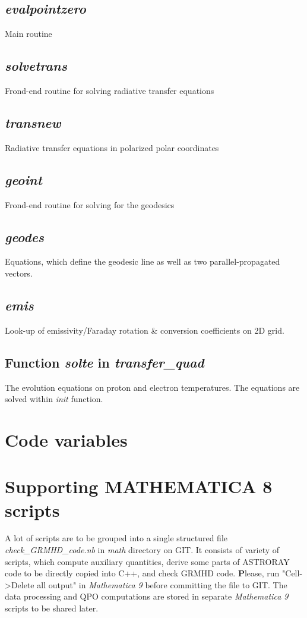 \documentclass{emulateapj}
\newcommand{\mat}{\textit{Mathematica 9 }}
\begin{document}
\subsection{\textit{evalpointzero}}
Main routine
\subsection{\textit{solvetrans}}
Frond-end routine for solving radiative transfer equations
\subsection{\textit{transnew}}
Radiative transfer equations in polarized polar coordinates
\subsection{\textit{geoint}}
Frond-end routine for solving for the geodesics
\subsection{\textit{geodes}}
Equations, which define the geodesic line as well as two parallel-propagated vectors.
\subsection{\textit{emis}}
Look-up of emissivity/Faraday rotation \& conversion coefficients on 2D grid.
\subsection{Function \textit{solte} in \textit{transfer\_quad}}
The evolution equations on proton and electron temperatures. The equations are solved within \textit{init} function.

\section{Code variables}


\section{Supporting MATHEMATICA 8 scripts}
A lot of scripts are to be grouped into a single structured file \textit{check\_GRMHD\_code.nb} in \textit{math} directory on GIT.
It consists of variety of scripts, which compute auxiliary quantities, derive some parts of ASTRORAY code to be directly copied into C++, and check GRMHD code.
{\textbf Please, run "Cell->Delete all output" in \mat before committing the file to GIT.}
The data processing and QPO computations are stored in separate \mat scripts to be shared later.
\end{document}

